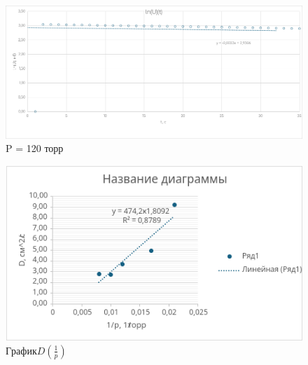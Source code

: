 \documentclass[a4paper, 10pt, twocolumn]{article}
\begin{document}
\begin{figure}[H]
    \centering
    \includegraphics[width=1\linewidth]{graphs/pressure_120.png}
    \begin{center}
        \caption{P = 120 торр}
    \end{center}
\end{figure}

\begin{figure}[H]
    \centering
    \includegraphics[width=1\linewidth]{graphs/D_ot_P.png}
    \begin{center}
        \caption{$График D(\frac{1}{p})$}
    \end{center}
\end{figure}
\end{document}
